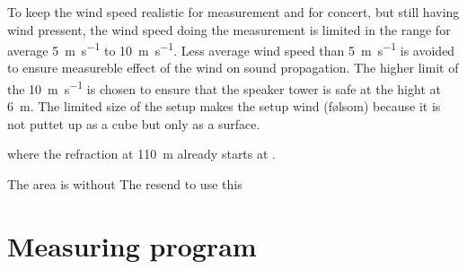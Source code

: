 To keep the wind speed realistic for measurement and for concert, but still having wind pressent, the wind speed doing the measurement is limited in the range for average \SI{5}{\meter\per\second} to \SI{10}{\meter\per\second}. Less average wind speed than \SI{5}{\meter\per\second} is avoided to ensure measureble effect of the wind on sound propagation. The higher limit of the \SI{10}{\meter\per\second} is chosen to ensure that the speaker tower is safe at the hight at \SI{6}{\meter}. The limited size of the setup makes the setup wind (følsom) because it is not puttet up as a cube but only as a surface. 




where the refraction at \SI{110}{\meter} already starts at . 


The area is without  The resend to use this  




\section{Measuring program}



